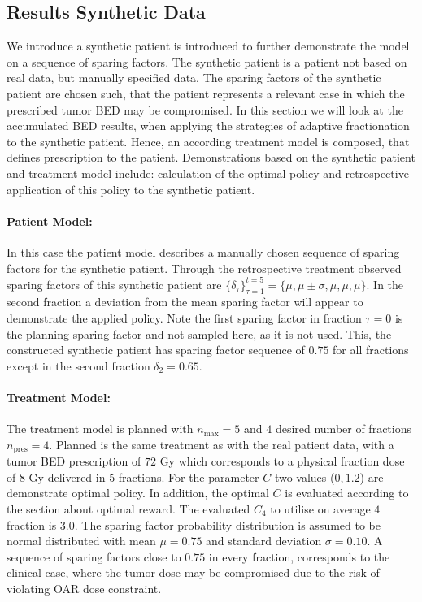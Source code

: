 \documentclass[\relativeRoot/ada.tex]{subfiles}
\begin{document}
\subsection{Results Synthetic Data}

We introduce a synthetic patient is introduced to further demonstrate the model on a sequence of sparing factors. The synthetic patient is a patient not based on real data, but manually specified data. The sparing factors of the synthetic patient are chosen such, that the patient represents a relevant case in which the prescribed tumor BED may be compromised. In this section we will look at the accumulated BED results, when applying the strategies of adaptive fractionation to the synthetic patient. Hence, an according treatment model is composed, that defines prescription to the patient. Demonstrations based on the synthetic patient and treatment model include: calculation of the optimal policy and retrospective application of this policy to the synthetic patient.

\paragraph{Patient Model:} In this case the patient model describes a manually chosen sequence of sparing factors for the synthetic patient. Through the retrospective treatment observed sparing factors of this synthetic patient are $\{\delta_\tau\}_{\tau=1}^{t=5} = \{\mu, \mu \pm \sigma, \mu,\mu, \mu \}$. In the second fraction a deviation from the mean sparing factor will appear to demonstrate the applied policy. Note the first sparing factor in fraction $\tau=0$ is the planning sparing factor and not sampled here, as it is not used. This, the constructed synthetic patient has sparing factor sequence of $0.75$ for all fractions except in the second fraction $\delta_2 = 0.65$. 

\paragraph{Treatment Model:} The treatment model is planned with $n_{\text{max}}=5$ and $4$ desired number of fractions $n_{\text{pres}}=4$. Planned is the same treatment as with the real patient data, with a tumor BED prescription of $72$ Gy which corresponds to a physical fraction dose of $8$ Gy delivered in $5$ fractions. For the parameter $C$ two values ($0, 1.2$) are demonstrate optimal policy. In addition, the optimal $C$ is evaluated according to the section about optimal reward. The evaluated $C_4$ to utilise on average $4$ fraction is $3.0$. The sparing factor probability distribution is assumed to be normal distributed with mean $\mu=0.75$ and standard deviation $\sigma = 0.10$. A sequence of sparing factors close to $0.75$ in every fraction, corresponds to the clinical case, where the tumor dose may be compromised due to the risk of violating OAR dose constraint.
\end{document}
